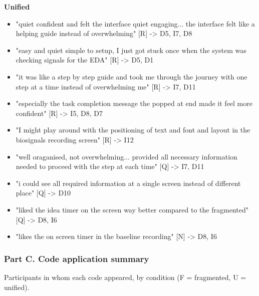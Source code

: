 \documentclass[
]{article}
\begin{document}
\textbf{Unified}

\begin{itemize}
\item
  "quiet confident and felt the interface quiet engaging... the interface felt like a helping guide instead of overwhelming" {[}R{]} -\textgreater{} D5, I7, D8
\item
  "easy and quiet simple to setup, I just got stuck once when the system was checking signals for the EDA" {[}R{]} -\textgreater{} D5, D1
\item
  "it was like a step by step guide and took me through the journey with one step at a time instead of overwhelming me" {[}R{]} -\textgreater{} I7, D11
\item
  "especially the task completion message the popped at end made it feel more confident" {[}R{]} -\textgreater{} I5, D8, D7
\item
  "I might play around with the positioning of text and font and layout in the biosignals recording screen" {[}R{]} -\textgreater{} I12
\item
  "well oraganised, not overwhelming... provided all necessary information needed to proceed with the step at each time" {[}Q{]} -\textgreater{} I7, D11
\item
  "i could see all required information at a single screen instead of different place" {[}Q{]} -\textgreater{} D10
\item
  "liked the idea timer on the screen way better compared to the fragmented" {[}Q{]} -\textgreater{} D8, I6
\item
  "likes the on screen timer in the baseline recording" {[}N{]} -\textgreater{} D8, I6
\end{itemize}

\hypertarget{part-c.-code-application-summary}{%
\subsubsection{Part C. Code application summary}\label{part-c.-code-application-summary}}

Participants in whom each code appeared, by condition (F = fragmented, U = unified).
\end{document}
